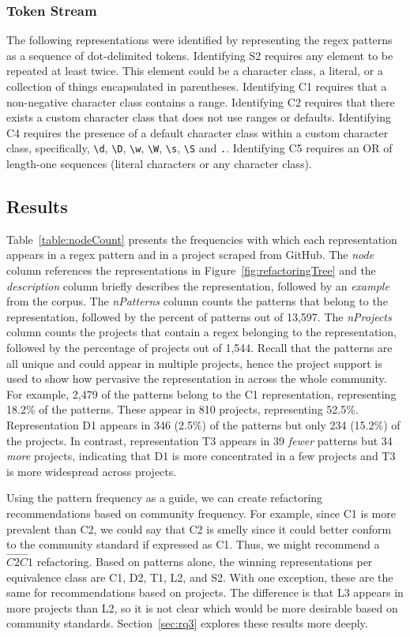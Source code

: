 \subsubsection{Token Stream }
The following representations were identified by representing the regex patterns as a sequence of dot-delimited tokens.
Identifying S2 requires any element to be repeated at least twice. This element could be a character class, a literal, or a collection of things encapsulated in parentheses.
Identifying C1 requires that a non-negative character class contains a range.  Identifying C2 requires that there exists a custom character class that does not use ranges or defaults. Identifying C4 requires the presence of a default character class within a custom character class, specifically, \verb!\d!, \verb!\D!, \verb!\w!, \verb!\W!, \verb!\s!, \verb!\S! and \verb!.!.  Identifying C5 requires an OR of length-one sequences (literal characters or any character class).


\subsection{Results}
Table~\ref{table:nodeCount} presents the frequencies with which each representation appears in a regex pattern and in a project scraped from GitHub. The \emph{node} column references the representations in Figure~\ref{fig:refactoringTree} and the \emph{description} column briefly describes the representation, followed by an \emph{example} from the corpus. The \emph{nPatterns} column counts the patterns that belong to the representation, followed by the percent of patterns out of 13,597.
The \emph{nProjects} column counts the projects that contain a regex belonging to the representation,
followed by the percentage of projects out of 1,544.
Recall that the patterns are all unique and could appear in multiple projects, hence the project support is used to show how pervasive the representation in across the whole community.
For example, 2,479 of the patterns belong to the C1 representation, representing 18.2\% of the patterns. These appear in 810 projects, representing 52.5\%.
 Representation D1 appears in 346 (2.5\%) of the patterns but only 234 (15.2\%) of the projects. In contrast, representation T3 appears in 39 \emph{fewer} patterns but 34 \emph{more} projects, indicating that D1 is more concentrated in a few projects and T3 is more widespread across projects.

Using the pattern frequency as a guide, we can create refactoring recommendations based on community frequency. For example, since C1 is more prevalent than C2, we could say that C2 is smelly since it could better conform to the community standard if expressed as C1. Thus, we might recommend a $\overrightarrow{C2C1}$ refactoring. Based on patterns alone, the winning representations per equivalence class are C1, D2, T1, L2, and S2. With one exception, these are the same for recommendations based on projects. The difference is that L3 appears in more projects than L2, so it is not clear which would be more desirable based on community standards. Section~\ref{sec:rq3} explores these results more deeply.

